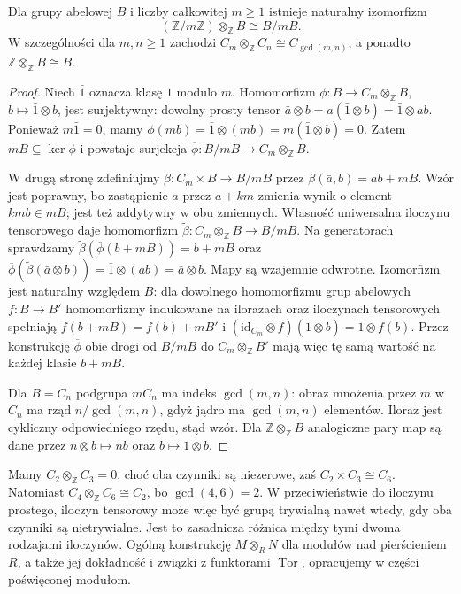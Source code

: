 \begin{twierdzenie}
\label{aa:tw:abelian-tensor-cyclic}
Dla grupy abelowej $B$ i liczby całkowitej $m\ge1$ istnieje
naturalny izomorfizm
\[
(\mathbb Z/m\mathbb Z)\otimes_{\mathbb Z} B\cong B/mB.
\]
W szczególności dla $m,n\ge1$ zachodzi
$C_m\otimes_{\mathbb Z}C_n\cong C_{\gcd(m,n)}$,
a ponadto $\mathbb Z\otimes_{\mathbb Z}B\cong B$.
\end{twierdzenie}
\begin{proof}
Niech $\bar1$ oznacza klasę $1$ modulo $m$.
Homomorfizm $\phi:B\to C_m\otimes_{\mathbb Z}B$, $b\mapsto\bar1\otimes b$,
jest surjektywny: dowolny prosty tensor
$\bar a\otimes b=a(\bar1\otimes b)=\bar1\otimes ab$.
Ponieważ $m\bar1=0$, mamy
$\phi(mb)=\bar1\otimes(mb)=m(\bar1\otimes b)=0$.
Zatem $mB\subseteq\ker\phi$ i powstaje surjekcja
$\overline\phi:B/mB\to C_m\otimes_{\mathbb Z}B$.

W drugą stronę zdefiniujmy
$\beta:C_m\times B\to B/mB$ przez
$\beta(\bar a,b)=ab+mB$.
Wzór jest poprawny, bo zastąpienie $a$ przez $a+km$
zmienia wynik o element $km b\in mB$;
jest też addytywny w obu zmiennych.
Własność uniwersalna iloczynu tensorowego daje homomorfizm
$\widetilde\beta:C_m\otimes_{\mathbb Z}B\to B/mB$.
Na generatorach sprawdzamy
$\widetilde\beta(\overline\phi(b+mB))=b+mB$
oraz $\overline\phi(\widetilde\beta(\bar a\otimes b))
=\bar1\otimes(ab)=\bar a\otimes b$.
Mapy są wzajemnie odwrotne. Izomorfizm jest naturalny
względem $B$: dla dowolnego homomorfizmu grup abelowych
$f:B\to B'$ homomorfizmy indukowane na ilorazach oraz
iloczynach tensorowych spełniają
$\overline f(b+mB)=f(b)+mB'$ i
$(\mathrm{id}_{C_m}\otimes f)(\bar1\otimes b)=\bar1\otimes f(b)$.
Przez konstrukcję $\overline\phi$ obie drogi od
$B/mB$ do $C_m\otimes_{\mathbb Z}B'$ mają więc tę samą
wartość na każdej klasie $b+mB$.

Dla $B=C_n$ podgrupa $mC_n$ ma indeks $\gcd(m,n)$:
obraz mnożenia przez $m$ w $C_n$ ma rząd
$n/\gcd(m,n)$, gdyż jądro ma $\gcd(m,n)$ elementów.
Iloraz jest cykliczny odpowiedniego rzędu, stąd wzór.
Dla $\mathbb Z\otimes_{\mathbb Z}B$ analogiczne pary map są dane przez
$n\otimes b\mapsto nb$ oraz $b\mapsto1\otimes b$.
\end{proof}

\begin{przyklad}
\label{aa:prz:abelian-tensor-contrasts}
Mamy $C_2\otimes_{\mathbb Z}C_3=0$, choć oba czynniki
są niezerowe, zaś $C_2\times C_3\cong C_6$.
Natomiast $C_4\otimes_{\mathbb Z}C_6\cong C_2$,
bo $\gcd(4,6)=2$.
W przeciwieństwie do iloczynu prostego, iloczyn tensorowy
może więc być grupą trywialną nawet wtedy, gdy oba czynniki
są nietrywialne. Jest to zasadnicza różnica między tymi
dwoma rodzajami iloczynów.
Ogólną konstrukcję $M\otimes_R N$ dla modułów nad
pierścieniem $R$, a także jej dokładność i związki
z funktorami $\operatorname{Tor}$, opracujemy w części
poświęconej modułom.
\end{przyklad}

\setlength{\parskip}{4pt}

